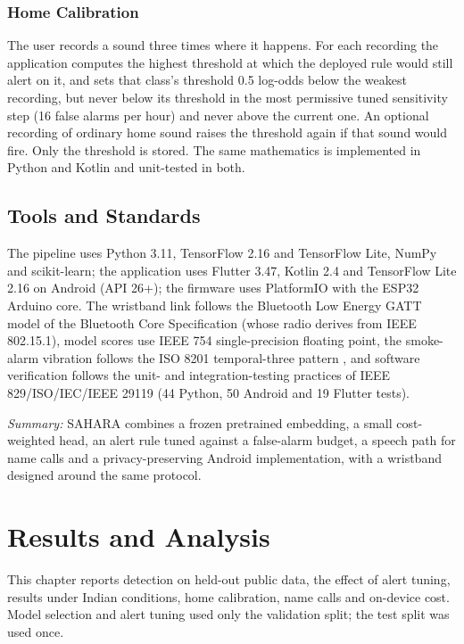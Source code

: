 \documentclass[12pt,a4paper,oneside]{report}
\begin{document}
\subsection{Home Calibration}
The user records a sound three times where it happens. For each recording the application computes the highest threshold at which the deployed rule would still alert on it, and sets that class's threshold 0.5 log-odds below the weakest recording, but never below its threshold in the most permissive tuned sensitivity step (16 false alarms per hour) and never above the current one. An optional recording of ordinary home sound raises the threshold again if that sound would fire. Only the threshold is stored. The same mathematics is implemented in Python and Kotlin and unit-tested in both.

\section{Tools and Standards}
The pipeline uses Python 3.11, TensorFlow 2.16 and TensorFlow Lite, NumPy and scikit-learn; the application uses Flutter 3.47, Kotlin 2.4 and TensorFlow Lite 2.16 on Android (API 26+); the firmware uses PlatformIO with the ESP32 Arduino core. The wristband link follows the Bluetooth Low Energy GATT model of the Bluetooth Core Specification (whose radio derives from IEEE 802.15.1), model scores use IEEE 754 single-precision floating point, the smoke-alarm vibration follows the ISO 8201 temporal-three pattern \cite{iso8201}, and software verification follows the unit- and integration-testing practices of IEEE 829/ISO/IEC/IEEE 29119 (44 Python, 50 Android and 19 Flutter tests).

\textit{Summary:} SAHARA combines a frozen pretrained embedding, a small cost-weighted head, an alert rule tuned against a false-alarm budget, a speech path for name calls and a privacy-preserving Android implementation, with a wristband designed around the same protocol.

\chapter{Results and Analysis}
This chapter reports detection on held-out public data, the effect of alert tuning, results under Indian conditions, home calibration, name calls and on-device cost. Model selection and alert tuning used only the validation split; the test split was used once.
\end{document}
